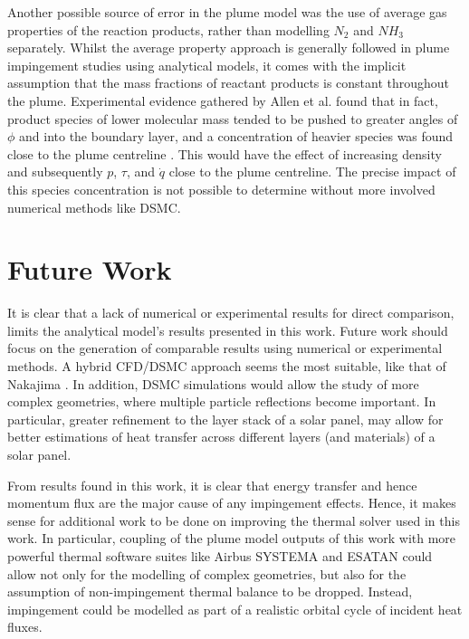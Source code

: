 \documentclass[journal]{new-aiaa}
\begin{document}
Another possible source of error in the plume model  was the use of average gas properties of the reaction products, rather than modelling $N_2$ and $NH_3$ separately. Whilst the average property approach is generally followed in plume impingement studies using analytical models, it comes with the implicit assumption that the mass fractions of reactant products is constant throughout the plume. Experimental evidence gathered by Allen et al. found that in fact, product species of lower molecular mass tended to be pushed to greater angles of $\phi$ and into the boundary layer, and a concentration of heavier species was found close to the plume centreline \cite{allenStudySpeciesSeparation1986}. This would have the effect of increasing density and subsequently $p$, $\tau$, and $\dot{q}$ close to the plume centreline. The precise impact of this species concentration is not possible to determine without more involved numerical methods like DSMC.


\section{Future Work}

It is clear that a lack of numerical or experimental results for direct comparison, limits the analytical model's results presented in this work. Future work should focus on the generation of comparable results using numerical or experimental methods. A hybrid CFD/DSMC approach seems the most suitable, like that of Nakajima \cite{nakajimaDetumblingSpaceDebris2016}. In addition, DSMC simulations would allow the study of more complex geometries, where multiple particle reflections become important. In particular, greater refinement to the layer stack of a solar panel, may allow for better estimations of heat transfer across different layers (and materials) of a solar panel.

From results found in this work, it is clear that energy transfer and hence momentum flux are the major cause of any impingement effects. Hence, it makes sense for additional work to be done on improving the thermal solver used in this work. In particular, coupling of the plume model outputs of this work with more powerful thermal software suites like Airbus SYSTEMA and ESATAN could allow not only for the modelling of complex geometries, but also for the assumption of non-impingement thermal balance to be dropped. Instead, impingement could be modelled as part of a realistic orbital cycle of incident heat fluxes.
\end{document}
